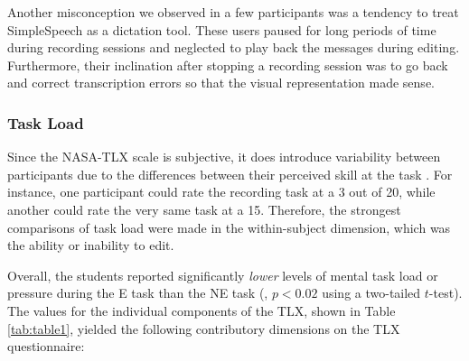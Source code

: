 

Another misconception we observed in a few participants was a tendency to treat SimpleSpeech as a dictation tool. 
These users paused for long periods of time during recording sessions and neglected to play back the messages during editing. 
Furthermore, their inclination after stopping a recording session was to go back and correct transcription errors so that the visual representation made sense.

\subsubsection{Task Load}
Since the NASA-TLX scale is subjective, it does introduce variability between participants due to the differences between their perceived skill at the task \cite{nasatlx}. 
For instance, one participant could rate the recording task at a 3 out of 20, while another could rate the very same task at a 15.
Therefore, the strongest comparisons of task load were made in the within-subject dimension, which was the ability or inability to edit.

Overall, the students reported significantly \emph{lower} levels of mental task load or pressure during the E task than the NE task (, $p<0.02$ using a two-tailed $t$-test). 
The values for the individual components of the TLX, shown in Table \ref{tab:table1}, yielded the following contributory dimensions on the TLX questionnaire:

